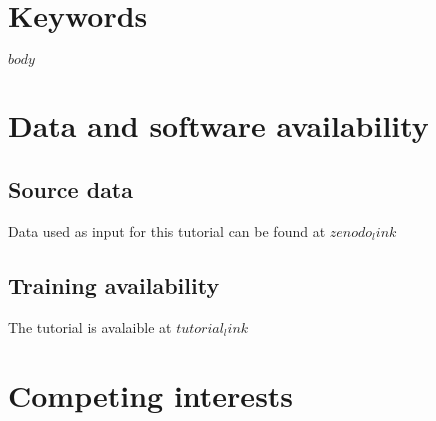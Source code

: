 \section*{\color{f1ROrange}Keywords}
\clearpage
\pagestyle{fancy}

$body$

\section*{Data and software availability} %


\subsection*{Source data}

Data used as input for this tutorial can be found at 
\href{$zenodo_link$}{$zenodo_link$}

\subsection*{Training availability}

The tutorial is avalaible at 
\href{$tutorial_link$}{$tutorial_link$}

\section*{Competing interests}


